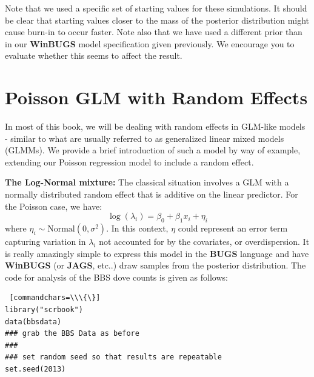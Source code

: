 {Note that we used a specific set of starting values for these
simulations. It should be clear that starting values closer to the
mass of the posterior distribution might cause burn-in to occur
faster. 
Note also that we have
used a different prior than in our {\bf WinBUGS} model specification
given previously. We encourage you to evaluate 
 whether this seems to affect the result.

\section{Poisson GLM with Random Effects}

In most of this book, we will be dealing with random
effects in GLM-like models - similar to what
are usually referred to as generalized
linear mixed models (GLMMs). We provide a brief introduction of such a
model by way of
example, extending our Poisson regression model to include a random effect.


{\bf The Log-Normal mixture:} The classical situation involves a GLM
with a normally distributed random effect that is additive on the
linear predictor. For the Poisson case, we have:
\[
 	\log(\lambda_{i}) = \beta_0  + \beta_1 x_{i} + \eta_{i}
\]
where $\eta_{i} \sim \mbox{Normal}(0,\sigma^{2})$. In this context, $\eta$ could represent an error term capturing variation in $\lambda_{i}$ not accounted for by the covariates, or overdispersion. 
It is really amazingly simple to
express this model in the {\bf BUGS} language and have {\bf WinBUGS}
(or {\bf JAGS}, etc..) draw
samples from the posterior distribution. The code for analysis of the
BBS dove counts is given as follows:
{\small
\begin{Verbatim} [commandchars=\\\{\}] 
library("scrbook")
data(bbsdata)
### grab the BBS Data as before
###
### set random seed so that results are repeatable
set.seed(2013)


\end{Verbatim}}}
